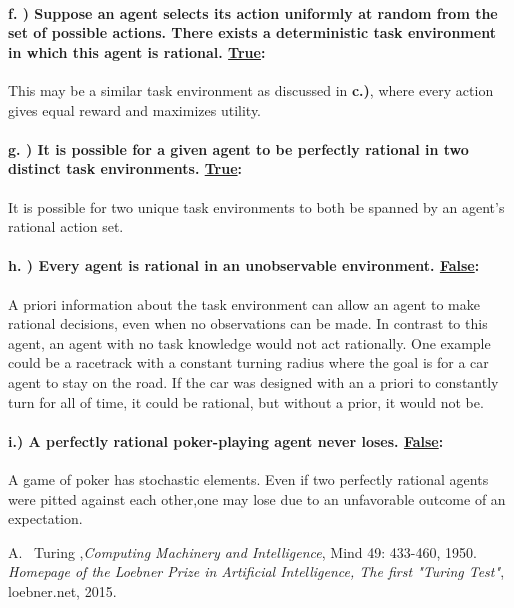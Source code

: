 \documentclass[12pt]{article}
\begin{document}
\paragraph{f. ) Suppose an agent selects its action uniformly at random from the set of possible actions. There exists a deterministic task environment in which this agent is rational. \underline{True}:}  This may be a similar task environment as discussed in \textbf{c.)}, where every action gives equal reward and maximizes utility.
\paragraph{g. ) It is possible for a given agent to be perfectly rational in two distinct task environments. \underline{True}:} It is possible for two  unique task environments to both be spanned by an agent's rational action set. 
\paragraph{h. ) Every agent is rational in an unobservable environment. \underline{False}:} A priori information about the task environment can allow an agent to make rational decisions, even when no observations can be made. In contrast to this agent, an agent with no task knowledge  would not act rationally. One example could be a racetrack with a constant turning radius where the goal is for a car agent to stay on the road. If the car was designed with an a priori to constantly turn for all of time, it could be rational, but without a prior, it would not be.
\paragraph{i.) A perfectly rational poker-playing agent never loses. \underline{False}:} A game of poker has stochastic elements. Even if two perfectly rational agents were pitted against each other,one may lose due to an unfavorable outcome of an expectation.

\begin{thebibliography}{2}

A. ~Turing ,\emph{Computing Machinery and Intelligence},  Mind 49: 433-460, 1950.
\emph{Homepage of the Loebner Prize in Artificial Intelligence, The first "Turing Test"}, loebner.net, 2015.

\end{thebibliography}
\end{document}
